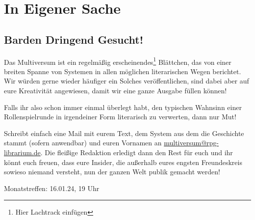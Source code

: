 \documentclass[final]{multiversum}
\begin{document}
\section{In Eigener Sache}
\subsection{Barden Dringend Gesucht!}
Das Multiversum ist ein regelmäßig erscheinendes\footnote{Hier Lachtrack
einfügen} Blättchen, das von einer breiten Spanne von Systemen in allen
möglichen literarischen Wegen berichtet. Wir würden gerne wieder häufiger
ein Solches veröffentlichen, sind dabei aber auf eure Kreativität angewiesen,
damit wir eine ganze Ausgabe füllen können!

Falls ihr also schon immer einmal überlegt habt, den typischen Wahnsinn einer
Rollenspielrunde in irgendeiner Form literarisch zu verwerten, dann nur Mut!

Schreibt einfach eine Mail mit eurem Text, dem System aus dem die Geschichte
stammt (sofern anwendbar) und euren Vornamen an
\url{multiversum@rpg-librarium.de}. Die fleißige Redaktion erledigt dann den
Rest für euch und ihr könnt euch freuen, dass eure Insider, die außerhalb eures
engsten Freundeskreis sowieso niemand versteht, nun der ganzen Welt publik
gemacht werden!



\begin{termine}
\item Monatstreffen: 16.01.24, 19 Uhr
\end{termine}
\impressum
\end{document}
